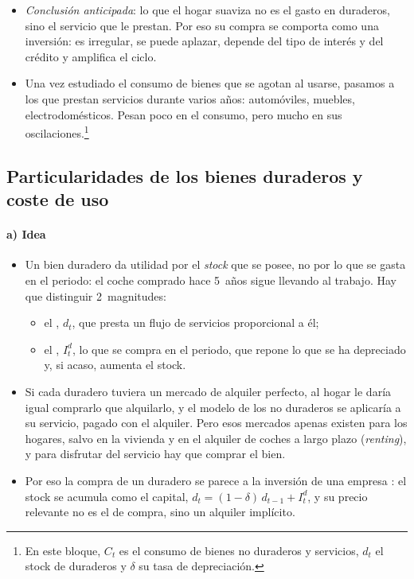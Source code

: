 \documentclass[11pt]{article}
\begin{document}
\begin{itemize}
\item \emph{Conclusión anticipada}: lo que el hogar suaviza no es el gasto en duraderos, sino el servicio que le prestan. Por eso su compra se comporta como una inversión: es irregular, se puede aplazar, depende del tipo de interés y del crédito y amplifica el ciclo.
\item Una vez estudiado el consumo de bienes que se agotan al usarse, pasamos a los que prestan servicios durante varios años: automóviles, muebles, electrodomésticos. Pesan poco en el consumo, pero mucho en sus oscilaciones.\footnote{En este bloque, $C_t$ es el consumo de bienes no duraderos y servicios, $d_t$ el stock de duraderos y $\delta$ su tasa de depreciación.}
\end{itemize}

\subsection{Particularidades de los bienes duraderos y coste de uso}\label{sec:duraderos-modelo}

\paragraph{a) Idea}

\begin{itemize}
\item Un bien duradero da utilidad por el \emph{stock} que se posee, no por lo que se gasta en el periodo: el coche comprado hace 5~años sigue llevando al trabajo. Hay que distinguir 2~magnitudes:
  \begin{itemize}
  \item el , $d_t$, que presta un flujo de servicios proporcional a él;
  \item el , $I^d_t$, lo que se compra en el periodo, que repone lo que se ha depreciado y, si acaso, aumenta el stock.
  \end{itemize}
\item Si cada duradero tuviera un mercado de alquiler perfecto, al hogar le daría igual comprarlo que alquilarlo, y el modelo de los no duraderos se aplicaría a su servicio, pagado con el alquiler. Pero esos mercados apenas existen para los hogares, salvo en la vivienda y en el alquiler de coches a largo plazo (\emph{renting}), y para disfrutar del servicio hay que comprar el bien.
\item Por eso la compra de un duradero se parece a la inversión de una empresa : el stock se acumula como el capital, $d_t=(1-\delta)\,d_{t-1}+I^d_t$, y su precio relevante no es el de compra, sino un alquiler implícito.
\end{itemize}
\end{document}
